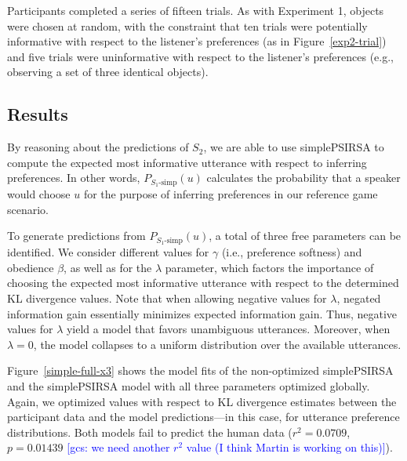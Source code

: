 \documentclass[10pt,a4paper]{article}
\newcommand{\gcs}[1]{\textcolor{blue}{[gcs: #1]}}
\begin{document}
Participants completed a series of fifteen trials. As with Experiment 1, objects were chosen at random, with the constraint that ten trials were potentially informative with respect to the listener's preferences (as in Figure~\ref{exp2-trial}) and five trials were uninformative with respect to the listener's preferences (e.g., observing a set of three identical objects).



\subsection{Results}


By reasoning about the predictions of $S_2$, we are able to use simplePSIRSA to compute the expected most informative utterance with respect to inferring preferences. In other words, $P_{S_1\textrm{-simp}}(u)$ calculates the probability that a speaker would choose $u$ for the purpose of inferring preferences in our reference game scenario.

To generate predictions from $P_{S_1\textrm{-simp}}(u)$, a total of three free parameters can be identified. 
We consider different values for $\gamma$ (i.e., preference softness) and obedience $\beta$, as well as for the $\lambda$ parameter, which factors the importance of choosing the expected most informative utterance with respect to the determined KL divergence values.
Note that when allowing negative values for $\lambda$, negated information gain essentially minimizes expected information gain.
Thus, negative values for $\lambda$ yield a model that favors unambiguous utterances. 
Moreover, when $\lambda=0$, the model collapses to a uniform distribution over the available utterances.



Figure~\ref{simple-full-x3} shows the model fits of the non-optimized simplePSIRSA and the simplePSIRSA model with all three parameters optimized globally. 
Again, we optimized values with respect to KL divergence estimates between the participant data and the model predictions---in this case, for utterance preference distributions.
Both models fail to predict the human data ($r^2=0.0709$, $p=0.01439$ \gcs{we need another $r^2$ value (I think Martin is working on this)}).
\end{document}
